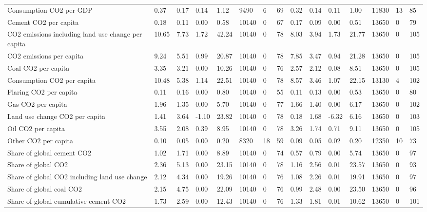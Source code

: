 \begin{longtable}{lllllllllllllll}
\addlinespace
Consumption CO2 per GDP & 0.37 & 0.17 & 0.14 & 1.12 & 9490 & 6 & 69 & 0.32 & 0.14 & 0.11 & 1.00 & 11830 & 13 & 85\\
Cement CO2 per capita & 0.18 & 0.11 & 0.00 & 0.58 & 10140 & 0 & 67 & 0.17 & 0.09 & 0.00 & 0.51 & 13650 & 0 & 79\\
CO2 emissions including land use change per capita & 10.65 & 7.73 & 1.72 & 42.24 & 10140 & 0 & 78 & 8.03 & 3.94 & 1.73 & 21.77 & 13650 & 0 & 105\\
CO2 emissions per capita & 9.24 & 5.51 & 0.99 & 20.87 & 10140 & 0 & 78 & 7.85 & 3.47 & 0.94 & 21.28 & 13650 & 0 & 105\\
Coal CO2 per capita & 3.35 & 3.21 & 0.00 & 10.26 & 10140 & 0 & 76 & 2.57 & 2.12 & 0.08 & 8.51 & 13650 & 0 & 105\\
\addlinespace
Consumption CO2 per capita & 10.48 & 5.38 & 1.14 & 22.51 & 10140 & 0 & 78 & 8.57 & 3.46 & 1.07 & 22.15 & 13130 & 4 & 102\\
Flaring CO2 per capita & 0.11 & 0.16 & 0.00 & 0.80 & 10140 & 0 & 55 & 0.11 & 0.13 & 0.00 & 0.53 & 13650 & 0 & 80\\
Gas CO2 per capita & 1.96 & 1.35 & 0.00 & 5.70 & 10140 & 0 & 77 & 1.66 & 1.40 & 0.00 & 6.17 & 13650 & 0 & 102\\
Land use change CO2 per capita & 1.41 & 3.64 & -1.10 & 23.82 & 10140 & 0 & 78 & 0.18 & 1.68 & -6.32 & 6.16 & 13650 & 0 & 103\\
Oil CO2 per capita & 3.55 & 2.08 & 0.39 & 8.95 & 10140 & 0 & 78 & 3.26 & 1.74 & 0.71 & 9.11 & 13650 & 0 & 105\\
\addlinespace
Other CO2 per capita & 0.10 & 0.05 & 0.00 & 0.20 & 8320 & 18 & 59 & 0.09 & 0.05 & 0.02 & 0.20 & 12350 & 10 & 73\\
Share of global cement CO2 & 1.02 & 1.71 & 0.00 & 8.89 & 10140 & 0 & 74 & 0.57 & 0.79 & 0.00 & 5.74 & 13650 & 0 & 97\\
Share of global CO2 & 2.36 & 5.13 & 0.00 & 23.15 & 10140 & 0 & 78 & 1.16 & 2.56 & 0.01 & 23.57 & 13650 & 0 & 93\\
Share of global CO2 including land use change & 2.12 & 4.34 & 0.00 & 19.26 & 10140 & 0 & 76 & 1.08 & 2.26 & 0.01 & 19.91 & 13650 & 0 & 97\\
Share of global coal CO2 & 2.15 & 4.75 & 0.00 & 22.09 & 10140 & 0 & 76 & 0.99 & 2.48 & 0.00 & 23.50 & 13650 & 0 & 96\\
\addlinespace
Share of global cumulative cement CO2 & 1.73 & 2.59 & 0.00 & 12.43 & 10140 & 0 & 76 & 1.33 & 1.81 & 0.01 & 10.62 & 13650 & 0 & 101\\

\end{longtable}
